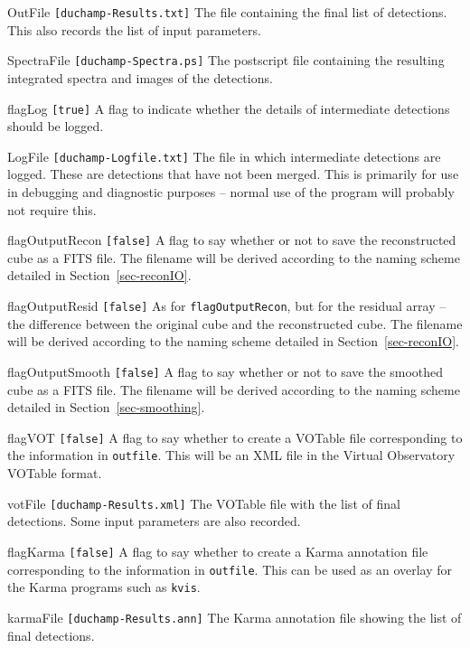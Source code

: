 \begin{entry}
\item[OutFile \texttt{[duchamp-Results.txt]}] The file containing the
  final list of detections. This also records the list of input
  parameters.
\item[SpectraFile \texttt{[duchamp-Spectra.ps]}] The postscript file
  containing the resulting integrated spectra and images of the
  detections. 
\item[flagLog \texttt{[true]}] A flag to indicate whether the
  details of intermediate detections should be logged.
\item[LogFile \texttt{[duchamp-Logfile.txt]}] The file in which
  intermediate detections are logged. These are detections that have
  not been merged. This is primarily for use in debugging and
  diagnostic purposes -- normal use of the program will probably not
  require this.
\item[flagOutputRecon \texttt{[false]}] A flag to say whether or not
  to save the reconstructed cube as a FITS file. The filename will be
  derived according to the naming scheme detailed in
  Section~\ref{sec-reconIO}.
\item[flagOutputResid \texttt{[false]}] As for
  \texttt{flagOutputRecon}, but for the residual array -- the
  difference between the original cube and the reconstructed cube. The
  filename will be derived according to the naming scheme detailed in
  Section~\ref{sec-reconIO}.
\item[flagOutputSmooth \texttt{[false]}] A flag to say whether or not
  to save the smoothed cube as a FITS file. The filename will be
  derived according to the naming scheme detailed in
  Section~\ref{sec-smoothing}.
\item[flagVOT \texttt{[false]}] A flag to say whether to create a
  VOTable file corresponding to the information in
  \texttt{outfile}. This will be an XML file in the Virtual
  Observatory VOTable format.
\item[votFile \texttt{[duchamp-Results.xml]}] The VOTable file with
  the list of final detections. Some input parameters are also
  recorded.
\item[flagKarma \texttt{[false]}] A flag to say whether to create a
  Karma annotation file corresponding to the information in
  \texttt{outfile}. This can be used as an overlay for the Karma
  programs such as \texttt{kvis}.
\item[karmaFile \texttt{[duchamp-Results.ann]}] The Karma annotation
  file showing the list of final detections. 

\end{entry}
